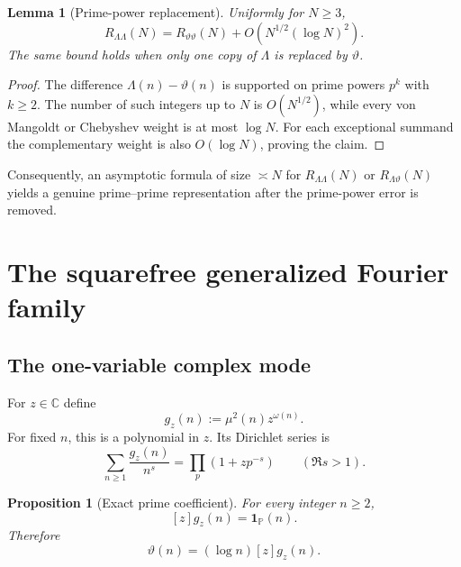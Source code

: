 \documentclass[11pt]{article}
\newtheorem{lemma}[theorem]{Lemma}
\newtheorem{proposition}[theorem]{Proposition}
\theoremstyle{definition}
\theoremstyle{remark}
\newcommand{\Pp}{\mathbb P}
\newcommand{\1}{\mathbf 1}
\begin{document}
\begin{lemma}[Prime-power replacement]\label{lem:prime-power}
Uniformly for $N\ge3$,
\begin{equation}\label{eq:pp-replacement}
R_{\Lambda\Lambda}(N)
=
R_{\vartheta\vartheta}(N)
+O\!\left(N^{1/2}(\log N)^2\right).
\end{equation}
The same bound holds when only one copy of $\Lambda$ is replaced by $\vartheta$.
\end{lemma}

\begin{proof}
The difference $\Lambda(n)-\vartheta(n)$ is supported on prime powers $p^k$ with $k\ge2$.  The number of such integers up to $N$ is $O(N^{1/2})$, while every von Mangoldt or Chebyshev weight is at most $\log N$.  For each exceptional summand the complementary weight is also $O(\log N)$, proving the claim.
\end{proof}

Consequently, an asymptotic formula of size $\asymp N$ for $R_{\Lambda\Lambda}(N)$ or $R_{\Lambda\vartheta}(N)$ yields a genuine prime--prime representation after the prime-power error is removed.

\section{The squarefree generalized Fourier family}

\subsection{The one-variable complex mode}

For $z\in\mathbb C$ define
\begin{equation}\label{eq:gz}
g_z(n):=\mu^2(n)z^{\omega(n)}.
\end{equation}
For fixed $n$, this is a polynomial in $z$.  Its Dirichlet series is
\begin{equation}\label{eq:gz-euler}
\sum_{n\ge1}\frac{g_z(n)}{n^s}
=
\prod_p(1+zp^{-s})
\qquad(\Re s>1).
\end{equation}

\begin{proposition}[Exact prime coefficient]\label{prop:prime-coeff}
For every integer $n\ge2$,
\begin{equation}\label{eq:prime-coeff}
[z]g_z(n)=\1_{\Pp}(n).
\end{equation}
Therefore
\begin{equation}\label{eq:theta-coeff}
\vartheta(n)=(\log n)[z]g_z(n).
\end{equation}
\end{proposition}
\end{document}

